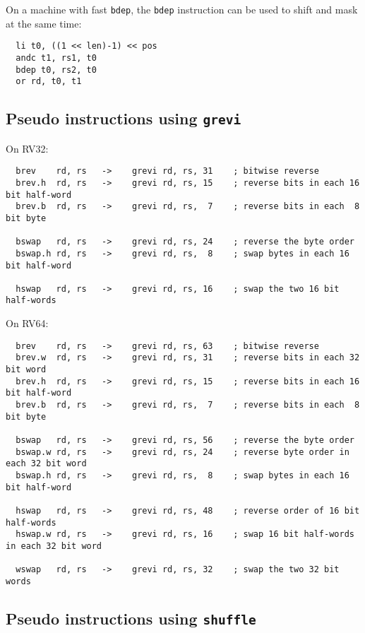 On a machine with fast {\tt bdep}, the {\tt bdep} instruction can be used to
shift and mask at the same time:

\begin{verbatim}
  li t0, ((1 << len)-1) << pos
  andc t1, rs1, t0
  bdep t0, rs2, t0
  or rd, t0, t1
\end{verbatim}

\subsection{Pseudo instructions using {\tt grevi}}

On RV32:

\begin{verbatim}
  brev    rd, rs   ->    grevi rd, rs, 31    ; bitwise reverse
  brev.h  rd, rs   ->    grevi rd, rs, 15    ; reverse bits in each 16 bit half-word
  brev.b  rd, rs   ->    grevi rd, rs,  7    ; reverse bits in each  8 bit byte

  bswap   rd, rs   ->    grevi rd, rs, 24    ; reverse the byte order
  bswap.h rd, rs   ->    grevi rd, rs,  8    ; swap bytes in each 16 bit half-word

  hswap   rd, rs   ->    grevi rd, rs, 16    ; swap the two 16 bit half-words
\end{verbatim}

On RV64:

\begin{verbatim}
  brev    rd, rs   ->    grevi rd, rs, 63    ; bitwise reverse
  brev.w  rd, rs   ->    grevi rd, rs, 31    ; reverse bits in each 32 bit word
  brev.h  rd, rs   ->    grevi rd, rs, 15    ; reverse bits in each 16 bit half-word
  brev.b  rd, rs   ->    grevi rd, rs,  7    ; reverse bits in each  8 bit byte

  bswap   rd, rs   ->    grevi rd, rs, 56    ; reverse the byte order
  bswap.w rd, rs   ->    grevi rd, rs, 24    ; reverse byte order in each 32 bit word
  bswap.h rd, rs   ->    grevi rd, rs,  8    ; swap bytes in each 16 bit half-word

  hswap   rd, rs   ->    grevi rd, rs, 48    ; reverse order of 16 bit half-words
  hswap.w rd, rs   ->    grevi rd, rs, 16    ; swap 16 bit half-words in each 32 bit word

  wswap   rd, rs   ->    grevi rd, rs, 32    ; swap the two 32 bit words
\end{verbatim}

\subsection{Pseudo instructions using {\tt shuffle}}

